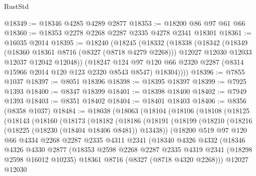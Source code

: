\begin{lexlean}{RustStd}
\begin{coremodule}
{\begin{coremodule}
{{{{{{{{{{{{{{{{{{{{{{{{{{{{{{{{{{{{{{{{{{{{{{{{{{{{{{@18349 := @18346 @4285 @4289 @2877
@18353 := @18200 @86 @97 @61 @66
@18360 := @18353 @2278 @2268 @2287 @2335 @4278 @2341 @18301
@18361 := @16035 @2014
@18395 := @18240
    (@18245
      (@18332
        (@18338
          (@18342
            (@18349
              (@18360 @18361 @8716 (@8327 (@8718 @4279 @2268)))
              @12027
              @12030
              @12033
              @12037
              @12042
              @12048))
          (@18247
            @124
            @97
            @120
            @66
            @2320
            @2287
            (@8314 @15966 @2014 @120 @123 @2320 @8543 @8547)
            @18304))))
@18396 := @7855 @1037
@18397 := @8051 @18396
@18398 := @18395 @18397
@18399 := @7925 @1393
@18400 := @8347 @18399
@18401 := @18398 @18400
@18402 := @7949 @1393
@18403 := @8351 @18402
@18404 := @18401 @18403
@18406 := @8356 (@8358 @1037)
@18484 := @18038
    (@18063
      (@18104
        (@18106
          (@18108
            (@18125
              (@18143
                (@18160
                  (@18173
                    (@18182
                      (@18186
                        (@18191
                          (@18199
                            (@18210
                              (@18216 (@18225 (@18230 (@18404 @18406 @8481)) @13438))
                              (@18200
                                @519
                                @97
                                @120
                                @66
                                @4334
                                @2268
                                @2287
                                @2335
                                @4311
                                @2341
                                (@18340
                                  @4326
                                  @4332
                                  (@18346
                                    @4326
                                    @4330
                                    @2877
                                    (@18353
                                      @2598
                                      @2268
                                      @2287
                                      @2335
                                      @4319
                                      @2341
                                      (@18298 @2598 @16012 @10235)
                                      @18361
                                      @8716
                                      (@8327 (@8718 @4320 @2268)))
                                    @12027
                                    @12030
}}}}}}}}}}}}}}}}}}}}}}}}}}}}}}}}}}}}}}}}}}}}}}}}}}}}}}
\end{coremodule}}
\end{coremodule}
\end{lexlean}

